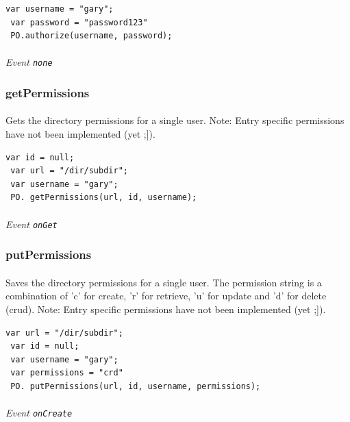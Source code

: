 \documentclass{report}
\begin{document}
\begin{Verbatim}[frame=single]
 var username = "gary";
 var password = "password123"
 PO.authorize(username, password);
\end{Verbatim}

\paragraph{}
\textit{Event \texttt{none}}

\subsubsection{getPermissions}
\paragraph{}
Gets the directory permissions for a single user. 
Note: Entry specific permissions have not been implemented (yet ;]).

\begin{Verbatim}[frame=single]
 var id = null;
 var url = "/dir/subdir";
 var username = "gary";
 PO. getPermissions(url, id, username);
\end{Verbatim}

\paragraph{}
\textit{Event \texttt{onGet}}

\subsubsection{putPermissions}
\paragraph{}
Saves the directory permissions for a single user.
The permission string is a combination of 'c' for create, 
'r' for retrieve, 'u' for update and 'd' for delete (crud).
Note: Entry specific permissions have not been implemented (yet ;]).

\begin{Verbatim}[frame=single]
 var url = "/dir/subdir";
 var id = null;
 var username = "gary";
 var permissions = "crd"
 PO. putPermissions(url, id, username, permissions);
\end{Verbatim}

\paragraph{}
\textit{Event \texttt{onCreate}}
\end{document}
